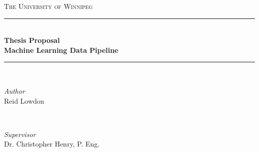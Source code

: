 \documentclass[12pt]{article}
\begin{document}
	
	
\begin{titlepage} %
	\newcommand{\HRule}{\rule{\linewidth}{0.5mm}} %
	\newcommand{\mainHeading}	{The University of Winnipeg}
	\newcommand{\courseName}	{Advanced Machine Learning}	
	\newcommand{\courseNumber}	{ACS-7401-002}
	\newcommand{\paperTitle}	{Thesis Proposal \\ Machine Learning Data Pipeline}
	\newcommand{\authorName}	{Reid Lowdon}
	\newcommand{\professorName}	{Dr. Christopher Henry, P. Eng.}
	
	\center %
	
	
	\textsc{\LARGE \mainHeading}\\[1.5cm] %
	
	
	
	
	\HRule\\[0.4cm]
	
	{\huge\bfseries \paperTitle}\\[0.4cm] %
	
	\HRule\\[1.5cm]
	
	
	\begin{minipage}{0.4\textwidth}
		\begin{flushleft}
			\large
			\textit{Author}\\
			\authorName %
		\end{flushleft}
	\end{minipage}
	~
	\begin{minipage}{0.4\textwidth}
		\begin{flushright}
			\large
			\textit{Supervisor}\\
			\professorName %
		\end{flushright}
	\end{minipage}
	

\end{titlepage}
\end{document}
